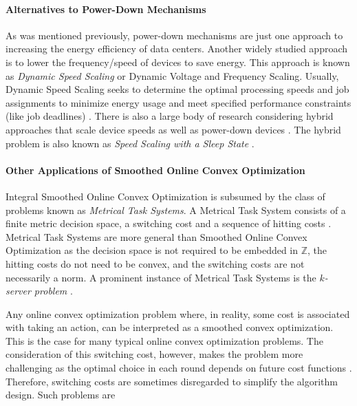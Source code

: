 \paragraph{Alternatives to Power-Down Mechanisms} As was mentioned previously, power-down mechanisms are just one approach to increasing the energy efficiency of data centers. Another widely studied approach is to lower the frequency/speed of devices to save energy. This approach is known as \textit{Dynamic Speed Scaling} or Dynamic Voltage and Frequency Scaling. Usually, Dynamic Speed Scaling seeks to determine the optimal processing speeds and job assignments to minimize energy usage and meet specified performance constraints (like job deadlines) \cite{Albers2007, Albers2011, Jin2016}. There is also a large body of research considering hybrid approaches that scale device speeds as well as power-down devices \cite{Jin2016}. The hybrid problem is also known as \textit{Speed Scaling with a Sleep State} \cite{Albers2014}.

\paragraph{Other Applications of Smoothed Online Convex Optimization} Integral Smoothed Online Convex Optimization is subsumed by the class of problems known as \textit{Metrical Task Systems}. A Metrical Task System consists of a finite metric decision space, a switching cost and a sequence of hitting costs \cite{Bubeck2018_3}. Metrical Task Systems are more general than Smoothed Online Convex Optimization as the decision space is not required to be embedded in $\mathbb{Z}$, the hitting costs do not need to be convex, and the switching costs are not necessarily a norm. A prominent instance of Metrical Task Systems is the \textit{$k$-server problem} \cite{Bubeck2017}.

Any online convex optimization problem where, in reality, some cost is associated with taking an action, can be interpreted as a smoothed convex optimization. This is the case for many typical online convex optimization problems. The consideration of this switching cost, however, makes the problem more challenging as the optimal choice in each round depends on future cost functions \cite{Chen2015}. Therefore, switching costs are sometimes disregarded to simplify the algorithm design. Such problems are

